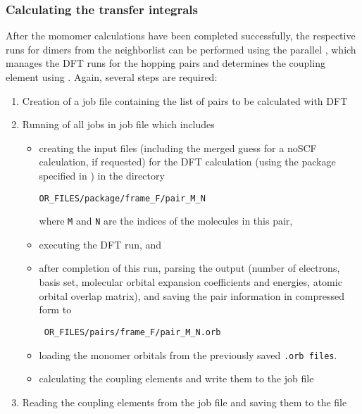 \subsubsection{Calculating the transfer integrals}
\label{sec:idft}
After the momomer calculations have been completed successfully, the respective 
runs for dimers from the neighborlist can be performed using the parallel 
 \calculator, which manages the DFT runs for the hopping pairs and 
determines the coupling element using \dipro. Again, several steps are required:
\begin{enumerate}
\item Creation of a job file containing the list of pairs to be calculated with 
DFT 
\item Running of all jobs in job file 
which includes
\begin{itemize}
\item creating the input files (including the merged guess for a noSCF 
calculation, if requested) for the DFT calculation (using the package specified 
in \xmloptions) in the directory 
\begin{verbatim}
OR_FILES/package/frame_F/pair_M_N
\end{verbatim}
where {\tt M} and {\tt N} are the indices of the molecules in this pair,
\item executing the DFT run, and
\item after completion of this run, parsing the output (number of electrons, 
basis set, molecular orbital expansion coefficients and energies, atomic orbital 
overlap matrix), and saving the pair information in compressed form to
\begin{verbatim}
 OR_FILES/pairs/frame_F/pair_M_N.orb 
\end{verbatim}
\item loading the monomer orbitals from the previously saved {\tt *.orb files}.
\item calculating the coupling elements and write them to the job file
\end{itemize}
\item Reading the coupling elements from the job file and saving them to the 
\sqlstate file
\end{enumerate}




